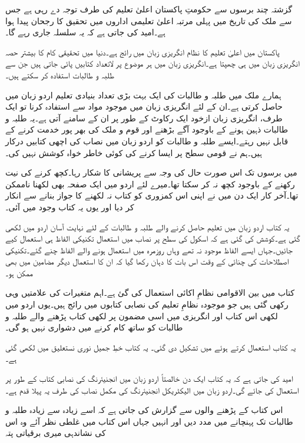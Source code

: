 گزشتہ چند برسوں سے حکومتِ پاکستان اعلیٰ تعلیم کی طرف توجہ دے رہی ہے جس سے ملک کی تاریخ میں پہلی مرتبہ اعلیٰ تعلیمی اداروں میں تحقیق کا رجحان پیدا ہوا ہے۔امید کی جاتی ہے کہ یہ سلسلہ جاری رہے گا۔

پاکستان میں اعلیٰ تعلیم کا نظام انگریزی زبان میں رائج ہے۔دنیا میں تحقیقی کام کا بیشتر حصہ انگریزی زبان میں ہی چھپتا ہے۔انگریزی زبان میں ہر موضوع پر لاتعداد کتابیں پائی جاتی ہیں جن سے طلبہ و طالبات استفادہ  کر سکتے ہیں۔

ہمارے ملک میں طلبہ و طالبات کی ایک بہت بڑی تعداد بنیادی تعلیم اردو زبان میں حاصل کرتی ہے۔ان کے لئے انگریزی زبان میں موجود مواد سے استفادہ  کرنا تو ایک طرف، انگریزی زبان ازخود ایک رکاوٹ کے طور پر ان کے سامنے آتی ہے۔یہ طلبہ و طالبات ذہین ہونے کے باوجود آگے بڑھنے اور قوم و ملک کی بھر پور خدمت کرنے کے قابل نہیں رہتے۔ایسے طلبہ و طالبات کو اردو زبان میں نصاب کی اچھی کتابیں درکار ہیں۔ہم نے قومی سطح پر ایسا کرنے کی کوئی خاطر خواہ کوشش نہیں کی۔ 

میں برسوں تک اس صورت حال کی وجہ سے پریشانی کا شکار رہا۔کچھ کرنے کی نیت رکھنے کے باوجود کچھ نہ کر سکتا تھا۔میرے لئے اردو میں ایک صفحہ بھی لکھنا ناممکن تھا۔آخر کار ایک دن میں نے اپنی اس کمزوری کو کتاب نہ لکھنے کا جواز بنانے سے انکار کر دیا اور یوں یہ کتاب وجود میں آئی۔

یہ کتاب اردو زبان میں تعلیم حاصل کرنے والے طلبہ و طالبات کے لئے نہایت آسان اردو میں لکھی گئی ہے۔کوشش کی گئی ہے کہ اسکول کی سطح پر نصاب میں استعمال تکنیکی الفاظ ہی استعمال کیے جائیں۔جہاں ایسے الفاظ موجود نہ تھے وہاں روزمرہ میں استعمال ہونے والے الفاظ چنے گئے۔تکنیکی اصطلاحات کی چنائی کے وقت اس بات کا دہان رکھا گیا کہ ان کا استعمال دیگر مضامین میں بھی ممکن ہو۔

کتاب میں بین الاقوامی نظامِ اکائی استعمال کی گئ ہے۔اہم متغیرات کی علامتیں وہی رکھی گئی ہیں جو موجودہ نظامِ تعلیم کی نصابی کتابوں میں رائج ہیں۔یوں اردو میں لکھی اس کتاب اور انگریزی میں اسی مضمون پر لکھی کتاب پڑھنے والے طلبہ و طالبات کو ساتھ کام کرنے میں دشواری نہیں ہو گی۔ 


یہ کتاب  استعمال کرتے ہوئے  میں تشکیل دی گئی۔ یہ کتاب خطِ جمیل نوری نستعلیق میں لکھی گئی ہے۔

امید کی جاتی ہے کہ یہ کتاب ایک دن خالصتاً اردو زبان میں انجنیئرنگ کی نصابی کتاب کے طور پر استعمال کی جائے گی۔اردو زبان میں الیکٹریکل انجنیئرنگ کی مکمل نصاب کی طرف یہ پہلا قدم ہے۔ 

اس کتاب کے پڑھنے والوں سے گزارش کی جاتی ہے کہ اسے زیادہ سے زیادہ طلبہ و طالبات تک پہنچانے میں مدد دیں اور انہیں جہاں اس کتاب میں غلطی نظر آئے وہ اس کی نشاندہی میری برقیاتی پتہ

